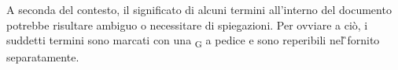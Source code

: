 A seconda del contesto, il significato di alcuni termini all'interno del documento potrebbe risultare
ambiguo o necessitare di spiegazioni. Per ovviare a ciò, i suddetti termini sono marcati con una \textsubscript
{G} a pedice e sono
reperibili nel \G\space fornito separatamente.